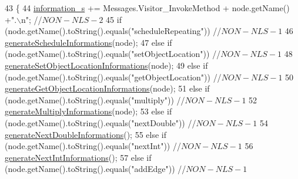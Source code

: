\begin{DoxyCode}
43                                                 \{
44         \hyperlink{classit_1_1isislab_1_1masonhelperdocumentation_1_1visitor_1_1_start_method_visitor_a59b86134adb11f995ce96c1a96b51d50}{information\_s} += Messages.Visitor\_InvokeMethod + node.getName() +\textcolor{stringliteral}{".\(\backslash\)n"}; \textcolor{comment}{//$NON-NLS-2$}
45         \textcolor{keywordflow}{if} (node.getName().toString().equals(\textcolor{stringliteral}{"scheduleRepeating"})) \textcolor{comment}{//$NON-NLS-1$}
46             \hyperlink{classit_1_1isislab_1_1masonhelperdocumentation_1_1visitor_1_1_start_method_visitor_a0961ec6f09ea3a15c8d97240d4703eb2}{generateScheduleInformations}(node); 
47         \textcolor{keywordflow}{else} \textcolor{keywordflow}{if} (node.getName().toString().equals(\textcolor{stringliteral}{"setObjectLocation"})) \textcolor{comment}{//$NON-NLS-1$}
48             \hyperlink{classit_1_1isislab_1_1masonhelperdocumentation_1_1visitor_1_1_start_method_visitor_a09299758d8f3ce54b04db73271dde0da}{generateSetObjectLocationInformations}(node);
49         \textcolor{keywordflow}{else} \textcolor{keywordflow}{if} (node.getName().toString().equals(\textcolor{stringliteral}{"getObjectLocation"})) \textcolor{comment}{//$NON-NLS-1$}
50             \hyperlink{classit_1_1isislab_1_1masonhelperdocumentation_1_1visitor_1_1_start_method_visitor_a6b99e9cd0aad1042fb318d546c51c04c}{generateGetObjectLocationInformations}(node);
51         \textcolor{keywordflow}{else} \textcolor{keywordflow}{if} (node.getName().toString().equals(\textcolor{stringliteral}{"multiply"})) \textcolor{comment}{//$NON-NLS-1$}
52             \hyperlink{classit_1_1isislab_1_1masonhelperdocumentation_1_1visitor_1_1_start_method_visitor_a32bf5cec17ee25b26220130c026393e5}{generateMultiplyInformations}(node);
53         \textcolor{keywordflow}{else} \textcolor{keywordflow}{if} (node.getName().toString().equals(\textcolor{stringliteral}{"nextDouble"})) \textcolor{comment}{//$NON-NLS-1$}
54             \hyperlink{classit_1_1isislab_1_1masonhelperdocumentation_1_1visitor_1_1_start_method_visitor_aca8c74b759d1c226b983a5fb2264c49e}{generateNextDoubleInformations}();
55         \textcolor{keywordflow}{else} \textcolor{keywordflow}{if} (node.getName().toString().equals(\textcolor{stringliteral}{"nextInt"})) \textcolor{comment}{//$NON-NLS-1$}
56             \hyperlink{classit_1_1isislab_1_1masonhelperdocumentation_1_1visitor_1_1_start_method_visitor_a97299094dabab3853b7c217b9d251e70}{generateNextIntInformations}();
57         \textcolor{keywordflow}{else} \textcolor{keywordflow}{if} (node.getName().toString().equals(\textcolor{stringliteral}{"addEdge"})) \textcolor{comment}{//$NON-NLS-1$}

\end{DoxyCode}
